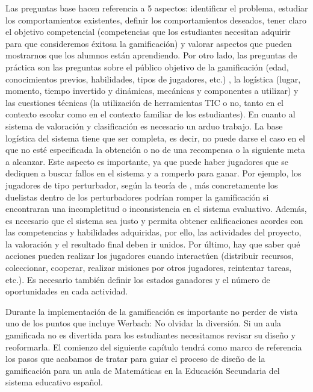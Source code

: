 Las preguntas base hacen referencia a 5 aspectos: identificar el problema, estudiar los comportamientos existentes, definir los comportamientos deseados, tener claro el objetivo competencial (competencias que los estudiantes necesitan adquirir para que consideremos éxitosa la gamificación) y valorar aspectos que pueden mostrarnos que los alumnos están aprendiendo.
%
Por otro lado, las preguntas de práctica son las preguntas sobre el público objetivo de la gamificación (edad, conocimientos previos, habilidades, tipos de jugadores, etc.) , la logística (lugar, momento, tiempo invertido y dinámicas, mecánicas y componentes a utilizar) y las cuestiones técnicas (la utilización de herramientas TIC o no, tanto en el contexto escolar como en el contexto familiar de los estudiantes).
%
En cuanto al sistema de valoración y clasificación es necesario un arduo trabajo.
%
La base logística del sistema tiene que ser completa, es decir, no puede darse el caso en el que no esté especificada la obtención o no de una recompensa o la siguiente meta a alcanzar.
%
Este aspecto es importante, ya que puede haber jugadores que se dediquen a buscar fallos en el sistema y a romperlo para ganar.
%
Por ejemplo, los jugadores de tipo perturbador, según la teoría de  \citet{marczewski}, más concretamente los duelistas dentro de los perturbadores podrían romper la gamificación si encontraran una incompletitud o inconsistencia en el sistema evaluativo.
%
Además, es necesario que el sistema sea justo y permita obtener calificaciones acordes con las competencias y habilidades adquiridas, por ello, las actividades del proyecto, la valoración y el resultado final deben ir unidos.
%
Por último, hay que saber qué acciones pueden realizar los jugadores cuando interactúen (distribuir recursos, coleccionar, cooperar, realizar misiones por otros jugadores, reintentar tareas, etc.). 
%
Es necesario también definir los estados ganadores y el número de oportunidades en cada actividad.

Durante la implementación de la gamificación es importante no perder de vista uno de los puntos que incluye Werbach: No olvidar la diversión.
%
Si un aula gamificada no es divertida para los estudiantes necesitamos revisar su diseño y reoformarla.
%
El comienzo del siguiente capítulo tendrá como marco de referencia los pasos que acabamos de tratar para guiar el proceso de diseño de la gamificación para un aula de Matemáticas en la Educación Secundaria del sistema educativo español.


